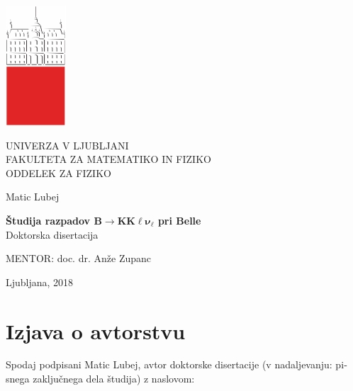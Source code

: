 \cleardoublepage
\begin{otherlanguage}{slovene}
\begin{center}

\includegraphics{fig/logo2}

{\large UNIVERZA V LJUBLJANI\\
FAKULTETA ZA MATEMATIKO IN FIZIKO\\
ODDELEK ZA FIZIKO\\}

\vspace{5cm}

{\Large Matic Lubej\\}

\vspace{10mm}

{\bf \Large Študija razpadov $\bm{B \to K K \ell \nu_\ell}$ pri Belle\\}
\vspace{5mm}
{\large Doktorska disertacija}\\

\vfill

{\large MENTOR: doc. dr. An\v ze Zupanc\\
}



\vspace{2cm}

{\large Ljubljana, 2018}

\end{center}

\cleardoublepage

\chapter*{Izjava o avtorstvu}
\thispagestyle{empty}

Spodaj podpisani Matic Lubej, avtor doktorske disertacije (v nadaljevanju: pisnega zaključnega dela študija) z naslovom:\\


\end{otherlanguage}
